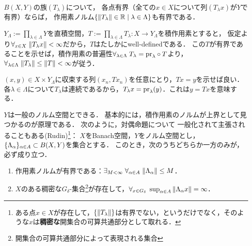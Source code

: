 \documentclass[uplatex,dvipdfmx]{jsreport}
\begin{document}
\begin{theorem}
    $B(X,Y)$の族$(T_\lambda)$について，
    各点有界（全ての$x\in X$について列$(T_\lambda x)$が$Y$で有界）ならば，
    作用素ノルム$\{\|T_\lambda\|\in\mathbb{R}\mid\lambda\in\Lambda\}$も有界である．
\end{theorem}
\begin{Proof}
    $Y_\Lambda:=\prod_{\lambda\in\Lambda}Y$を直積空間，$T:=\prod_{\lambda\in\Lambda}T_\lambda:X\to Y_\Lambda$を積作用素とすると，
    仮定より$\forall_{x\in X}\;\|T_\lambda x\|<\infty$だから，$T$はたしかにwell-definedである．
    この$T$が有界であることを示せば，積作用素の普遍性$\forall_{\lambda\in\Lambda}\;T_\lambda=\mathrm{pr}_\lambda\circ T$より，$\forall_{\lambda\in\Lambda}\;\|T_\lambda\|\le\|T\|<\infty$が従う．

    $(x,y)\in X\times Y_\Lambda$に収束する列$(x_n,Tx_n)$を任意にとり，$Tx=y$を示せば良い．
    各$\lambda\in\Lambda$について$T_\lambda$は連続であるから，$T_\lambda x=\mathrm{pr}_\lambda(y)$．これは$y=Tx$を意味する．
\end{Proof}
\begin{remark}
    $Y$は一般のノルム空間とできる．
    基本的には，積作用素のノルムが上界として見つかるのが原理である．
    次のように，対偶命題について
    一般化されて主張されることもある(Rudin)\footnote{ある点$x\in X$が存在して，$\{\|T_\lambda\|\}$は有界でない，というだけでなく，そのような$x$は\textbf{稠密な}開集合の可算共通部分として取れる．}：
    $X$をBanach空間，$Y$をノルム空間とし，$\{\Lambda_\alpha\}_{\alpha\in A}\subset B(X,Y)$を集合とする．
    このとき，次のうちどちらか一方のみが，必ず成り立つ．
    \begin{enumerate}
        \item 作用素ノルムが有界である：$\exists_{M<\infty}\;\forall_{\alpha\in A}\;\|\Lambda_\alpha\|\le M$．
        \item $X$のある稠密な$G_\delta$-集合\footnote{開集合の可算共通部分によって表現される集合}が存在して，$\forall_{x\in G_\delta}\;\sup_{\alpha\in A}\|\Lambda_\alpha x\|=\infty$．
    \end{enumerate}
\end{remark}
\end{document}
